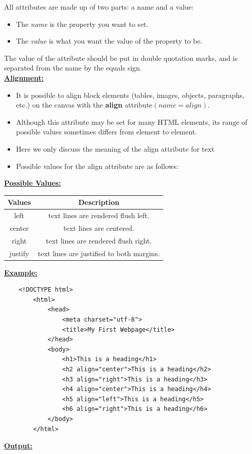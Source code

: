 \documentclass[11pt,a4paper]{article}
\begin{document}
All attributes are made up of two parts: a name and a value:
\begin{itemize}
\item The \emph{name} is the property you want to set. 
\item The \emph{value} is what you want the value of the property to be.
\end{itemize}
The value of the attribute should be put in double quotation marks, and is separated from the name by the equals sign. \\

\underline{\textbf{Alignment:}}
\begin{itemize}
\item It is possible to align block elements (tables, images, objects, paragraphs, etc.) on the canvas with the \textbf{align} attribute$(name = align)$. 
\item Although this attribute may be set for many HTML elements, its range of possible values sometimes differs from element to element.
\item Here we only discuss the meaning of the align attribute for text
\item Possible values for the align attribute are as follows:
\end{itemize}

\underline{\textbf{Possible Values:}}\\

\begin{center}
\begin{tabular}{| c | c |}\hline
\textbf{Values} & \textbf{Description} \\ \hline
left & text lines are rendered flush left. \\ \hline
center & text lines are centered.\\ \hline
right & text lines are rendered flush right.\\ \hline
justify & text lines are justified to both margins.\\ \hline
\end{tabular}
\end{center}

\underline{\textbf{Example:}}
\begin{verbatim}
    <!DOCTYPE html>
        <html>
            <head>
                <meta charset="utf-8">
                <title>My First Webpage</title>
            </head>
            <body>
                <h1>This is a heading</h1>
                <h2 align="center">This is a heading</h2>
                <h3 align="right">This is a heading</h3>
                <h4 align="center">This is a heading</h4>
                <h5 align="left">This is a heading</h5>
                <h6 align="right">This is a heading</h6>
            </body>
        </html>
\end{verbatim}
\underline{\textbf{Output:}}\
\end{document}

